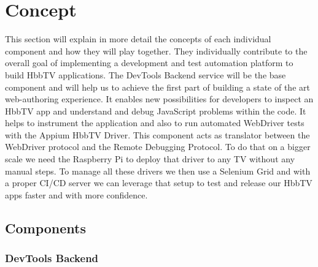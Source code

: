 %
%

\chapter{Concept\label{cha:concept}}

This section will explain in more detail the concepts of each individual component and how they will
play together. They individually contribute to the overall goal of implementing a development and
test automation platform to build HbbTV applications. The DevTools Backend service will be the base
component and will help us to achieve the first part of building a state of the art web-authoring
experience. It enables new possibilities for developers to inspect an HbbTV app and understand and debug
JavaScript problems within the code. It helps to instrument the application and also to run automated
WebDriver tests with the Appium HbbTV Driver. This component acts as translator between the WebDriver
protocol and the Remote Debugging Protocol. To do that on a bigger scale we need the Raspberry Pi to
deploy that driver to any TV without any manual steps. To manage all these drivers we then use a
Selenium Grid and with a proper CI/CD server we can leverage that setup to test and release our HbbTV
apps faster and with more confidence.

\section{Components\label{sec:components}}

\subsection{DevTools Backend\label{sec:devtoolsbackend}}

